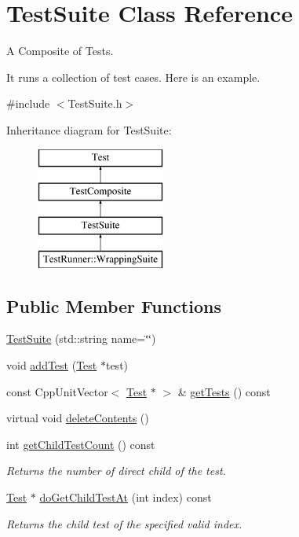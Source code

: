 \hypertarget{class_test_suite}{}\section{Test\+Suite Class Reference}
\label{class_test_suite}


A Composite of Tests.

It runs a collection of test cases. Here is an example.  




{\ttfamily \#include $<$Test\+Suite.\+h$>$}

Inheritance diagram for Test\+Suite\+:\begin{figure}[H]
\begin{center}
\leavevmode
\includegraphics[height=4.000000cm]{class_test_suite}
\end{center}
\end{figure}
\subsection*{Public Member Functions}
\begin{DoxyCompactItemize}
\item 
\hyperlink{class_test_suite_aedef358022b725810f2f145ac078c01b}{Test\+Suite} (std\+::string name=\char`\"{}\char`\"{})
\item 
void \hyperlink{class_test_suite_a8cd9628eee382a9670076765ec25cfa8}{add\+Test} (\hyperlink{class_test}{Test} $\ast$test)
\item 
const Cpp\+Unit\+Vector$<$ \hyperlink{class_test}{Test} $\ast$ $>$ \& \hyperlink{class_test_suite_ad2bd3e20523bb357b7a4608a7978ea49}{get\+Tests} () const 
\item 
virtual void \hyperlink{class_test_suite_ac968917f934d102227abd8b2130e67f9}{delete\+Contents} ()
\item 
int \hyperlink{class_test_suite_aeaabfd3afef12412cd390b90128a7d87}{get\+Child\+Test\+Count} () const \hypertarget{class_test_suite_aeaabfd3afef12412cd390b90128a7d87}{}\label{class_test_suite_aeaabfd3afef12412cd390b90128a7d87}

\begin{DoxyCompactList}\small\item\em Returns the number of direct child of the test. \end{DoxyCompactList}\item 
\hyperlink{class_test}{Test} $\ast$ \hyperlink{class_test_suite_aab4d1f64d7b32a24489cc2a3f3e412ee}{do\+Get\+Child\+Test\+At} (int index) const 
\begin{DoxyCompactList}\small\item\em Returns the child test of the specified valid index. \end{DoxyCompactList}\end{DoxyCompactItemize}
